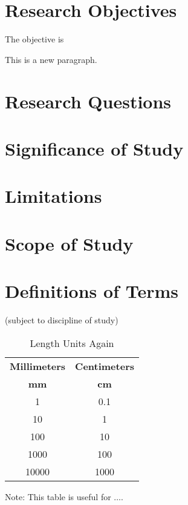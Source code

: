 \section{Research Objectives}
The objective is 

This is a new paragraph.


\section{Research Questions}

\section{Significance of Study}

\section{Limitations}

\section{Scope of Study}

\section{Definitions of Terms}
(subject to discipline of study)

\begin{table}[ht]
    \caption{Length Units Again}
    \begin{tabular}{cc}
        \toprule %
        \textbf{Millimeters} & \textbf{Centimeters}\\
        \textbf{mm}          &   \textbf{cm}\\
        \midrule
        1           &   0.1\\ \hline
        10          &   1\\ \hline
        100         &   10\\ \hline
        1000        &   100\\ \hline
        10000       &   1000\\
        \bottomrule
    \end{tabular}
    \par\raggedright Note: This table is useful for $\ldots$.
    \label{table:lengthunitsa}
\end{table}
